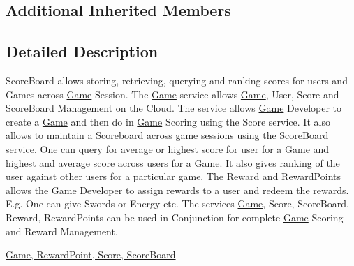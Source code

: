 \subsection*{Additional Inherited Members}


\subsection{Detailed Description}
Score\+Board allows storing, retrieving, querying and ranking scores for users and Games across \hyperlink{classcom_1_1shephertz_1_1app42_1_1paas_1_1sdk_1_1csharp_1_1game_1_1_game}{Game} Session. The \hyperlink{classcom_1_1shephertz_1_1app42_1_1paas_1_1sdk_1_1csharp_1_1game_1_1_game}{Game} service allows \hyperlink{classcom_1_1shephertz_1_1app42_1_1paas_1_1sdk_1_1csharp_1_1game_1_1_game}{Game}, User, Score and Score\+Board Management on the Cloud. The service allows \hyperlink{classcom_1_1shephertz_1_1app42_1_1paas_1_1sdk_1_1csharp_1_1game_1_1_game}{Game} Developer to create a \hyperlink{classcom_1_1shephertz_1_1app42_1_1paas_1_1sdk_1_1csharp_1_1game_1_1_game}{Game} and then do in \hyperlink{classcom_1_1shephertz_1_1app42_1_1paas_1_1sdk_1_1csharp_1_1game_1_1_game}{Game} Scoring using the Score service. It also allows to maintain a Scoreboard across game sessions using the Score\+Board service. One can query for average or highest score for user for a \hyperlink{classcom_1_1shephertz_1_1app42_1_1paas_1_1sdk_1_1csharp_1_1game_1_1_game}{Game} and highest and average score across users for a \hyperlink{classcom_1_1shephertz_1_1app42_1_1paas_1_1sdk_1_1csharp_1_1game_1_1_game}{Game}. It also gives ranking of the user against other users for a particular game. The Reward and Reward\+Points allows the \hyperlink{classcom_1_1shephertz_1_1app42_1_1paas_1_1sdk_1_1csharp_1_1game_1_1_game}{Game} Developer to assign rewards to a user and redeem the rewards. E.\+g. One can give Swords or Energy etc. The services \hyperlink{classcom_1_1shephertz_1_1app42_1_1paas_1_1sdk_1_1csharp_1_1game_1_1_game}{Game}, Score, Score\+Board, Reward, Reward\+Points can be used in Conjunction for complete \hyperlink{classcom_1_1shephertz_1_1app42_1_1paas_1_1sdk_1_1csharp_1_1game_1_1_game}{Game} Scoring and Reward Management. 

\hyperlink{classcom_1_1shephertz_1_1app42_1_1paas_1_1sdk_1_1csharp_1_1game_1_1_score_board_service}{Game, Reward\+Point, Score, Score\+Board} 

